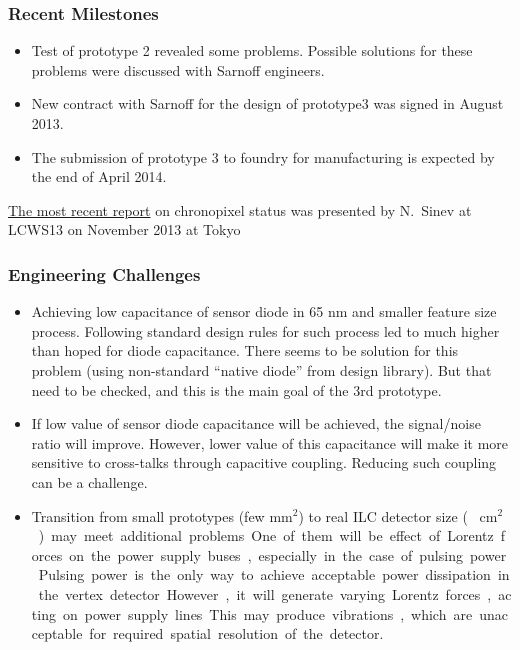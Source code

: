 \subsubsection{Recent Milestones}
\begin{itemize}
    \item Test of prototype 2 revealed some problems. Possible solutions for these problems were discussed with Sarnoff engineers.  
    \item New contract with Sarnoff for the design of prototype3 was signed in August 2013.
    \item The submission of prototype 3 to foundry for manufacturing is expected by the end of April 2014.
\end{itemize}
\href{https://agenda.linearcollider.org/getFile.py/access?contribId=309&sessionId=37&resId=1&materialId=slides&confId=6000}{The most recent report} on chronopixel status was presented by N.~Sinev at LCWS13 on November 2013 at Tokyo 

\subsubsection{Engineering Challenges}
\begin{itemize}
    \item Achieving low capacitance of sensor diode in 65 nm and smaller feature size process. Following standard design rules for such process led to much higher than hoped for diode capacitance. There seems to be solution for this problem (using non-standard “native diode” from design library). But that need to be checked, and this is the main goal of the 3rd prototype. 
    \item If low value of sensor diode capacitance will be achieved, the signal/noise ratio will improve. However, lower value of this capacitance will make it more sensitive to cross-talks through capacitive coupling. Reducing such coupling can be a challenge.
    \item Transition from small prototypes (few $\text{mm}^{2}$) to real ILC detector size (~ \unit[10]{$\text{cm}^2$}) may meet additional problems. One of them will be effect of Lorentz forces on the power supply buses, especially in the case of pulsing power. Pulsing power is the only way to achieve acceptable power dissipation in the vertex detector. However, it will generate varying Lorentz forces, acting on power supply lines. This may produce vibrations, which are unacceptable for required spatial resolution of the detector.
\end{itemize}


